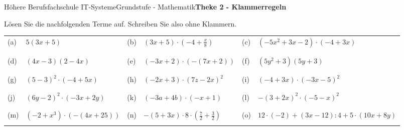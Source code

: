 \documentclass[oneside,openany,headings=optiontotoc,11pt,numbers=noenddot]{scrreprt}
\begin{document}
	\begin{worksheet}{Höhere Berufsfachschule IT-Systeme}{Grundstufe - Mathematik}{\textbf{Theke 2 - Klammerregeln}}
		\begin{framed}
			\noindent
			Lösen Sie die nachfolgenden Terme auf. Schreiben Sie also ohne Klammern.\\
			\begin{tabularx}{\textwidth}{lXlXlX}
				\\
				(a) & \(5(3x+5)\) & (b) & \((3x+5)\cdot(-4+\frac{x}{8})\) & (c) & \((-5x^2+3x-2)\cdot(-4+3x)\)\\
				\\
				\hline
				\\
				(d) & \((4x-3)(2-4x)\) & (e) & \((-3x+2)\cdot(-(7x+2))\) & (f) & \((5y^2+3)(5y+3)\)\\
				\\
				\hline
				\\
				(g) & \((5-3)^2\cdot(-4+5x)\) & (h) & \((-2x+3)\cdot(7z-2x)^2\) & (i) & \((-4+3x)\cdot(-3x-5)^2\)\\
				\\
				\hline
				\\
				(j) & \((6y-2)^2\cdot(-3x+2y)\) & (k) & \((-3a+4b)\cdot(-x+1)\) & (l) & \(-(3+2x)^2\cdot(-5-x)^2\)\\
				\\
				\hline
				\\
				(m) & \((-2+x^3)\cdot(-(4x+25))\) & (n) & \(-(5+3x)\cdot{}8\cdot(\frac{7}{2}+\frac{3}{2})\) & (o) & \(12\cdot(-2) + (3x-12):4 + 5\cdot{}(10x+8y)\)\\
				\\
				\hline
			\end{tabularx}
		\end{framed}
	\end{worksheet}
\end{document}
